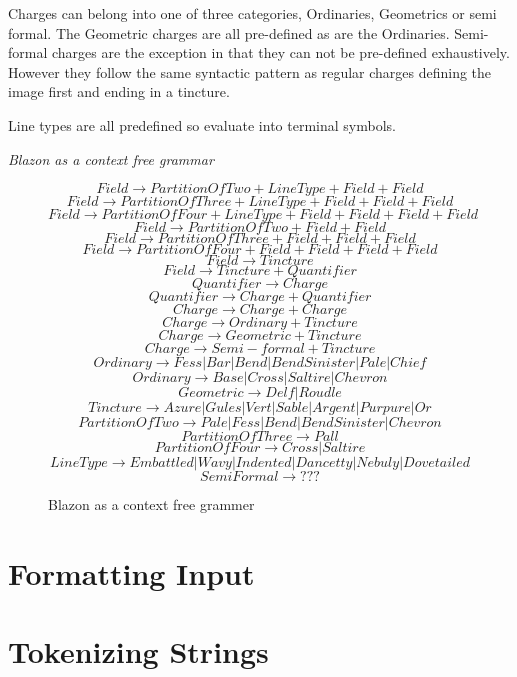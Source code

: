 Charges can belong into one of three categories, Ordinaries, Geometrics or semi formal.  The Geometric charges are all pre-defined as are the Ordinaries.  Semi-formal charges are the exception in that they can not be pre-defined exhaustively.  However they follow the same syntactic pattern as regular charges defining the image first and ending in a tincture.


Line types are all predefined so evaluate into terminal symbols. 


\emph{Blazon as a context free grammar}
\begin{figure}[H]

 \[
  Field \to  Partition  Of  Two + Line Type + Field + Field   \] \[
  Field \to  Partition  Of  Three + Line Type  + Field + Field + Field   \] \[
  Field \to  Partition  Of  Four + Line Type  + Field + Field + Field + Field \] \[
  Field \to  Partition  Of  Two  + Field + Field   \] \[
  Field \to  Partition  Of  Three + Field + Field + Field   \] \[
  Field \to  Partition  Of  Four + Field + Field + Field + Field \] \[
  Field \to  Tincture \] \[
  Field \to Tincture + Quantifier \] 
  \[Quantifier \to Charge\]
  \[Quantifier \to Charge + Quantifier\]
  \[ Charge \to Charge + Charge \] \[
  Charge \to Ordinary  + Tincture \] \[
  Charge \to Geometric  + Tincture \] \[
  Charge \to Semi-formal + Tincture \] \[
  Ordinary \to Fess | Bar | Bend | Bend Sinister | Pale | Chief \]
  \[Ordinary \to Base | Cross | Saltire | Chevron  \] \[
  Geometric \to Delf | Roudle  \] \[
  Tincture \to Azure | Gules | Vert | Sable | Argent | Purpure | Or \] \[
  Partition  Of  Two \to Pale | Fess | Bend | Bend Sinister | Chevron \] \[
  Partition  Of  Three \to Pall \] \[
  Partition  Of  Four \to  Cross | Saltire  \] \[
  Line Type \to Embattled | Wavy | Indented | Dancetty | Nebuly | Dovetailed  \]
  \[ Semi Formal \to ???  \] 

\caption{Blazon as a context free grammer}
\end{figure}

\section{Formatting Input}

\section{Tokenizing Strings} 